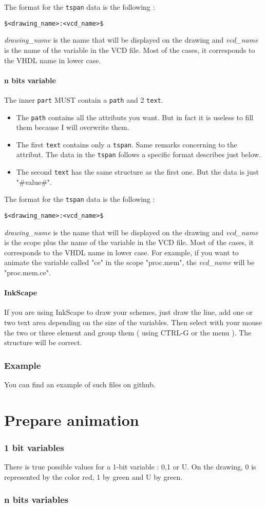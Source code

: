 \documentclass[a4paper]{article}
\begin{document}
The format for the \texttt{tspan} data is the following :
\begin{center}
\texttt{\$<drawing\_name>:<vcd\_name>\$}
\end{center}
\emph{drawing\_name} is the name that will be displayed on the drawing and \emph{vcd\_name} is the name of the variable in the VCD file. Most of the cases, it corresponds to the VHDL name in lower case.

\subsection{n bits variable}
The inner \texttt{part} MUST contain a \texttt{path} and 2 \texttt{text}. 
\begin{itemize}
\item The \texttt{path} contains all the attributs you want. But in fact it is useless to fill them because  I will overwrite them.
\item The first \texttt{text} contains only a \texttt{tspan}. Same remarks concerning to the attribut. The data in the \texttt{tspan} follows a specific format describes just below.
\item The second \texttt{text} has the same structure as the first one. But the data is just "\#value\#". 
\end{itemize}

The format for the \texttt{tspan} data is the following :
\begin{center}
\texttt{\$<drawing\_name>:<vcd\_name>\$}
\end{center}
\emph{drawing\_name} is the name that will be displayed on the drawing and \emph{vcd\_name} is the scope plus the name of the variable in the VCD file. Most of the cases, it corresponds to the VHDL name in lower case. 
For example, if you want to animate the variable called "ce" in the scope "proc.mem", the \emph{vcd\_name} will be "proc.mem.ce". 

\subsection{InkScape}
If you are using InkScape to draw your schemes, just draw the line, add one or two text area depending on the size of the variables. Then select with your mouse the two or three element and group them ( using CTRL-G or the menu ). The structure will be correct.

\section{Example}
You can find an example of such files on github. 

\newpage
\part{Prepare animation}
\newpage

\section{1 bit variables}
There is true possible values for a 1-bit variable : 0,1 or U. On the drawing, 0 is represented by the color red, 1 by green and U by green.
\section{n bits variables}
\end{document}
